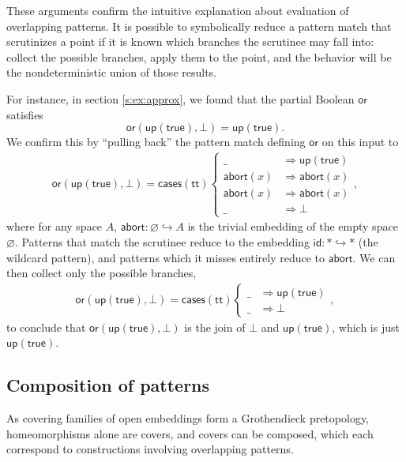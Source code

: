 \documentclass[conference]{IEEEtran}
\newcommand{\hookto}{\hookrightarrow}
\newcommand{\Zero}{\varnothing}
\newcommand{\One}{\ast}
\newcommand{\wildcard}{\_}
\newcommand{\Branch}{\Rightarrow}
\newcommand{\up}{\mathsf{up}}
\newcommand{\btrue}{\mathsf{true}}
\begin{document}
These arguments confirm the intuitive explanation about evaluation of overlapping patterns. It is possible to symbolically reduce a pattern match that scrutinizes a point if it is known which branches the scrutinee may fall into: collect the possible branches, apply them to the point, and the behavior will be the nondeterministic union of those results.

For instance, in section \ref{s:ex:approx}, we found that the partial Boolean $\mathsf{or}$ satisfies
\[
\mathsf{or}(\mathsf{up}(\mathsf{true}), \bot) = \mathsf{up}(\mathsf{true}).
\]
We confirm this by ``pulling back'' the pattern match defining $\mathsf{or}$ on this input to
\begin{align*}
\mathsf{or}(\mathsf{up}(\mathsf{true}), \bot) = \mathsf{cases}(\mathsf{tt})
\begin{cases}
\wildcard &\Branch \up(\btrue)
\\ \mathsf{abort}(x) &\Branch \mathsf{abort}(x)
\\ \mathsf{abort}(x) &\Branch \mathsf{abort}(x)
\\ \wildcard &\Branch \bot
\end{cases},
\end{align*}
where for any space $A$, $\mathsf{abort} : \Zero \hookto A$ is the trivial embedding of the empty space $\Zero$. Patterns that match the scrutinee reduce to the embedding $\mathsf{id} : \One \hookto \One$ (the wildcard pattern), and patterns which it misses entirely reduce to $\mathsf{abort}$. We can then collect only the possible branches,
\begin{align*}
\mathsf{or}(\mathsf{up}(\mathsf{true}), \bot) = \mathsf{cases}(\mathsf{tt})
\begin{cases}
\wildcard &\Branch \up(\btrue)
\\ \wildcard &\Branch \bot
\end{cases},
\end{align*}
to conclude that $\mathsf{or}(\mathsf{up}(\mathsf{true}), \bot)$ is the join of $\bot$ and $\mathsf{up}(\mathsf{true})$, which is just $\mathsf{up}(\mathsf{true})$.

\subsection{Composition of patterns}

As covering families of open embeddings form a Grothendieck pretopology, homeomorphisms alone are covers, and covers can be composed, which each correspond to constructions involving overlapping patterns.
\end{document}
